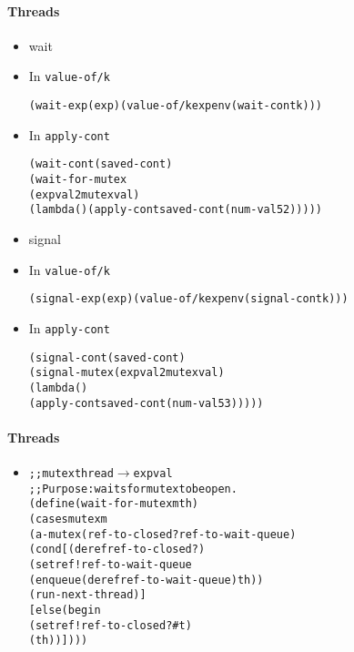 \documentclass{beamer}
\newcommand{\arrow}{\(\rightarrow\)}
\begin{document}
\begin{frame}[fragile]
\framesubtitle{Threads}
\begin{scriptsize}
\begin{itemize}
\item<1-> wait

\item<1-> In \texttt{value-of/k}
\begin{alltt}
(wait-exp (exp) (value-of/k exp env (wait-cont k)))
\end{alltt}

\item<2-> In \texttt{apply-cont}
\begin{alltt}
(wait-cont (saved-cont)
  (wait-for-mutex
    (expval2mutex val)
    (lambda () (apply-cont saved-cont (num-val 52)))))
\end{alltt}

\item<3-> signal

\item<3-> In \texttt{value-of/k}
\begin{alltt}
(signal-exp (exp) (value-of/k exp env (signal-cont k)))
\end{alltt}

\item<4-> In \texttt{apply-cont}
\begin{alltt}
(signal-cont (saved-cont)
  (signal-mutex (expval2mutex val)
                (lambda () 
                  (apply-cont saved-cont (num-val 53)))))
\end{alltt}

\end{itemize}
\end{scriptsize}
\end{frame}

\begin{frame}[fragile]
\framesubtitle{Threads}
\begin{scriptsize}
\begin{itemize}
\item<1-> 
\begin{alltt}
;; mutex thread \arrow{} expval
;; Purpose: waits for mutex to be open.
(define (wait-for-mutex m th)
  (cases mutex m
    (a-mutex (ref-to-closed? ref-to-wait-queue)
      (cond [(deref ref-to-closed?)
             (setref! ref-to-wait-queue
                      (enqueue (deref ref-to-wait-queue) th))
             (run-next-thread)]
            [else (begin
                     (setref! ref-to-closed? #t)
                     (th))])))
\end{alltt}

\end{itemize}
\end{scriptsize}
\end{frame}
\end{document}
